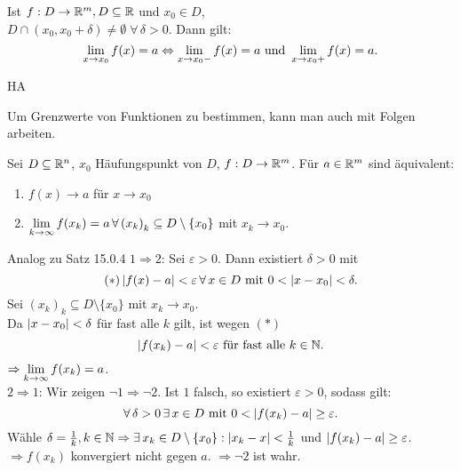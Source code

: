 \documentclass[../ana1.tex]{subfiles}
\begin{document}
\begin{bem}
    Ist \( f: D \rightarrow \mathbb{R}^m, D \subseteq \mathbb{R} \) und \( x_0 \in D \),\\
    \( D \cap (x_0, x_0 + \delta) \neq \emptyset \;\forall \, 
    \delta > 0 \). Dann gilt: 
    \[ \lim\limits_{x\rightarrow x_0} f(x) = a \Leftrightarrow
    \lim\limits_{x\rightarrow x_0-} f(x) = a \text{ und } \lim\limits_{x\rightarrow x_0+} 
    f(x) = a. \]
\end{bem}
\begin{bew}
    HA
\end{bew}
Um Grenzwerte von Funktionen zu bestimmen, kann man auch 
mit Folgen arbeiten.
\begin{satz}
    Sei \( D \subseteq \mathbb{R}^n \), \(x_0 \) Häufungspunkt von 
    \( D \), \( f: D \rightarrow \mathbb{R}^m \). Für \( a\in \mathbb{R}^m \) 
    sind äquivalent:
    \begin{enumerate}
        \item \( f(x) \rightarrow a \) für \( x\rightarrow x_0 \)
        \item \( \lim\limits_{k\rightarrow\infty} f(x_k) = a \,\forall \, {(x_k)}_k 
        \subseteq D \setminus \{x_0\} \) mit \( x_k \rightarrow x_0 \).
    \end{enumerate}
\end{satz}
\begin{bew}
    Analog zu Satz 15.0.4
    \( 1 \Rightarrow 2 \): Sei \( \varepsilon > 0 \). Dann 
    existiert \( \delta > 0 \) mit 
    \[ (*) \left|f(x) - a\right| < \varepsilon \,\forall \, x\in D 
    \text{ mit } 0 < \left|x-x_0\right| < \delta. \]
    Sei \( {(x_k)}_k \subseteq D \setminus \{x_0\} \) mit 
    \( x_k \rightarrow x_0 \).\\
    Da \( \left|x-x_0\right| < \delta \) für fast alle \(k\) gilt, 
    ist wegen \( (*) \)
    \[ \left|f(x_k) - a\right| < \varepsilon \text{ für fast alle } k\in\mathbb{N}. \]
    \( \Rightarrow \lim\limits_{k\rightarrow\infty} f(x_k) = a \).\\
    \( 2 \Rightarrow 1\): Wir zeigen 
    \( \neg 1 \Rightarrow \neg 2\).
    Ist \( 1 \) falsch, so existiert \( \varepsilon > 0 \), sodass
    gilt: 
    \[ \forall \, \delta > 0 \,\exists \, x \in D \text{ mit } 0 < 
    \left|f(x_k) - a\right| \geq \varepsilon. \]
    Wähle \( \delta = \frac{1}{k}, k\in\mathbb{N} \Rightarrow \exists \, x_k 
    \in D\setminus \{ x_0 \} : \left|x_k - x\right| < \frac{1}{k} \) und 
    \( \left|f(x_k) - a\right| \geq \varepsilon \).\\
    \( \Rightarrow f(x_k) \) konvergiert nicht gegen \(a\). 
    \( \Rightarrow \neg 2 \) ist wahr.
\end{bew}
\end{document}
